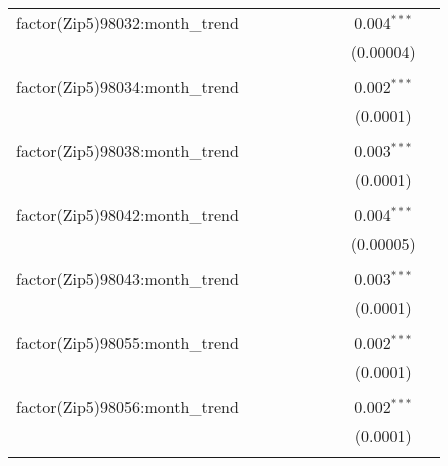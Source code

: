\begin{table}[H]
{\begin{tabular}{@{\extracolsep{5pt}}lcccccccc}
  factor(Zip5)98032:month\_trend &  &  &  &  &  &  & 0.004$^{***}$ &  \\  

   &  &  &  &  &  &  & (0.00004) &  \\  

   & & & & & & & & \\  

  factor(Zip5)98034:month\_trend &  &  &  &  &  &  & 0.002$^{***}$ &  \\  

   &  &  &  &  &  &  & (0.0001) &  \\  

   & & & & & & & & \\  

  factor(Zip5)98038:month\_trend &  &  &  &  &  &  & 0.003$^{***}$ &  \\  

   &  &  &  &  &  &  & (0.0001) &  \\  

   & & & & & & & & \\  

  factor(Zip5)98042:month\_trend &  &  &  &  &  &  & 0.004$^{***}$ &  \\  

   &  &  &  &  &  &  & (0.00005) &  \\  

   & & & & & & & & \\  

  factor(Zip5)98043:month\_trend &  &  &  &  &  &  & 0.003$^{***}$ &  \\  

   &  &  &  &  &  &  & (0.0001) &  \\  

   & & & & & & & & \\  

  factor(Zip5)98055:month\_trend &  &  &  &  &  &  & 0.002$^{***}$ &  \\  

   &  &  &  &  &  &  & (0.0001) &  \\  

   & & & & & & & & \\  

  factor(Zip5)98056:month\_trend &  &  &  &  &  &  & 0.002$^{***}$ &  \\  

   &  &  &  &  &  &  & (0.0001) &  \\  

   & & & & & & & & \\  


\end{tabular}}
\end{table}
